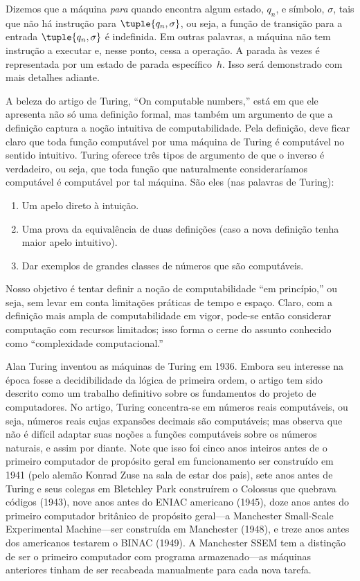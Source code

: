 \documentclass[../../../include/open-logic-section]{subfiles}
\begin{document}
\begin{explain}
Dizemos que a máquina \emph{para} quando encontra algum estado,
$q_n$, e símbolo, $\sigma$, tais que não há instrução para
$\tuple{q_n, \sigma}$, ou seja, a função de transição para a entrada
$\tuple{q_n,\sigma}$ é indefinida. Em outras palavras, a máquina não tem
instrução a executar e, nesse ponto, cessa a
operação. A parada às vezes é representada por um estado de parada
específico~$h$. Isso será demonstrado com mais detalhes adiante.
\end{explain}

\begin{digress}
A beleza do artigo de Turing, ``On computable numbers,'' está em que ele
apresenta não só uma definição formal, mas também um argumento de que a
definição captura a noção intuitiva de computabilidade.
Pela definição, deve ficar claro que toda função computável
por uma máquina de Turing é computável no sentido intuitivo. Turing
oferece três tipos de argumento de que o inverso é verdadeiro, ou seja, que
toda função que naturalmente consideraríamos computável é
computável por tal máquina. São eles (nas palavras de Turing):
\begin{enumerate}
\item Um apelo direto à intuição.
\item Uma prova da equivalência de duas definições (caso a nova
  definição tenha maior apelo intuitivo).
\item Dar exemplos de grandes classes de números que são
  computáveis.
\end{enumerate}
Nosso objetivo é tentar definir a noção de computabilidade ``em
princípio,'' ou seja, sem levar em conta limitações práticas
de tempo e espaço. Claro, com a definição mais ampla de
computabilidade em vigor, pode-se então considerar computação
com recursos limitados; isso forma o cerne do assunto conhecido como
``complexidade computacional.''
\end{digress}

\begin{history}
Alan Turing inventou as máquinas de Turing em 1936. Embora seu interesse na
época fosse a decidibilidade da lógica de primeira ordem, o artigo tem sido
descrito como um trabalho definitivo sobre os fundamentos do projeto de
computadores. No artigo, Turing concentra-se em números reais computáveis, ou seja,
números reais cujas expansões decimais são computáveis; mas observa
que não é difícil adaptar suas noções a funções computáveis sobre
os números naturais, e assim por diante. Note que isso foi cinco
anos inteiros antes de o primeiro computador de propósito geral em funcionamento ser construído em
1941 (pelo alemão Konrad Zuse na sala de estar dos pais), sete
anos antes de Turing e seus colegas em Bletchley Park construírem o
Colossus que quebrava códigos (1943), nove anos antes do ENIAC americano
(1945), doze anos antes do primeiro computador britânico de propósito geral---a Manchester Small-Scale Experimental Machine---ser construída em
Manchester (1948), e treze anos antes dos americanos testarem o
BINAC (1949). A Manchester SSEM tem a distinção de
ser o primeiro computador com programa armazenado---as máquinas anteriores tinham de ser
recabeada manualmente para cada nova tarefa.
\end{history}
\end{document}
